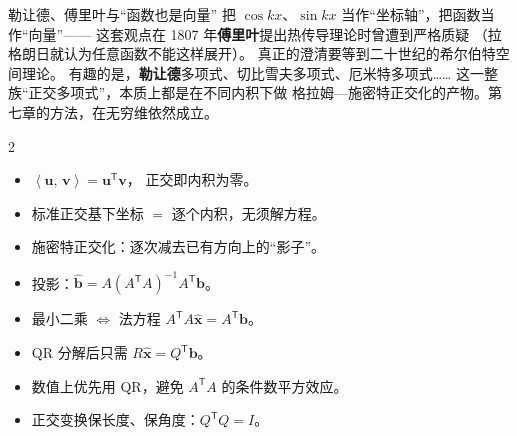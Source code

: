 \documentclass[11pt,a4paper,openany]{ctexbook}
\newcommand{\ip}[2]{\left\langle #1,\,#2 \right\rangle}
\begin{document}
\begin{sidebar}{勒让德、傅里叶与“函数也是向量”}
把 $\cos kx$、$\sin kx$ 当作“坐标轴”，把函数当作“向量”——
这套观点在 1807 年\textbf{傅里叶}提出热传导理论时曾遭到严格质疑
（拉格朗日就认为任意函数不能这样展开）。
真正的澄清要等到二十世纪的希尔伯特空间理论。
有趣的是，\textbf{勒让德}多项式、切比雪夫多项式、厄米特多项式……
这一整族“正交多项式”，本质上都是在不同内积下做
格拉姆—施密特正交化的产物。第七章的方法，在无穷维依然成立。
\end{sidebar}

\begin{chapkeys}
\small
\begin{multicols}{2}
\begin{itemize}[leftmargin=1.5em, itemsep=2pt]
\item $\ip{\boldsymbol{u}}{\boldsymbol{v}}=\boldsymbol{u}^{\mathsf T}\boldsymbol{v}$，
      正交即内积为零。
\item 标准正交基下坐标 $=$ 逐个内积，无须解方程。
\item 施密特正交化：逐次减去已有方向上的“影子”。
\item 投影：$\widehat{\boldsymbol{b}}=A(A^{\mathsf T}A)^{-1}A^{\mathsf T}\boldsymbol{b}$。
\item 最小二乘 $\Leftrightarrow$ 法方程 $A^{\mathsf T}A\widehat{\boldsymbol{x}}=A^{\mathsf T}\boldsymbol{b}$。
\item QR 分解后只需 $R\widehat{\boldsymbol{x}}=Q^{\mathsf T}\boldsymbol{b}$。
\item 数值上优先用 QR，避免 $A^{\mathsf T}A$ 的条件数平方效应。
\item 正交变换保长度、保角度：$Q^{\mathsf T}Q=I$。
\end{itemize}
\end{multicols}
\end{chapkeys}
\end{document}
